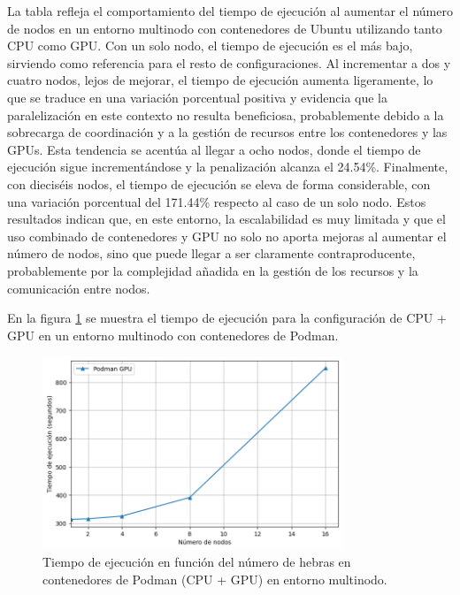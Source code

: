 La tabla refleja el comportamiento del tiempo de ejecución al aumentar el número de nodos en un entorno multinodo con contenedores de Ubuntu utilizando tanto CPU como GPU. Con un solo nodo, el tiempo de ejecución es el más bajo, sirviendo como referencia para el resto de configuraciones. Al incrementar a dos y cuatro nodos, lejos de mejorar, el tiempo de ejecución aumenta ligeramente, lo que se traduce en una variación porcentual positiva y evidencia que la paralelización en este contexto no resulta beneficiosa, probablemente debido a la sobrecarga de coordinación y a la gestión de recursos entre los contenedores y las GPUs. Esta tendencia se acentúa al llegar a ocho nodos, donde el tiempo de ejecución sigue incrementándose y la penalización alcanza el 24.54\%. Finalmente, con dieciséis nodos, el tiempo de ejecución se eleva de forma considerable, con una variación porcentual del 171.44\% respecto al caso de un solo nodo. Estos resultados indican que, en este entorno, la escalabilidad es muy limitada y que el uso combinado de contenedores y GPU no solo no aporta mejoras al aumentar el número de nodos, sino que puede llegar a ser claramente contraproducente, probablemente por la complejidad añadida en la gestión de los recursos y la comunicación entre nodos.

En la figura \ref{fig:multi-node_ubuntu_podman_gpu_time} se muestra el tiempo de ejecución para la configuración de CPU + GPU en un entorno multinodo con contenedores de Podman.

\begin{figure}[H]
    \centering
    \includegraphics[width=0.8\textwidth]{imagenes/cap5/multi-node_ubuntu_podman_gpu_time.png}
    \caption{Tiempo de ejecución en función del número de hebras en contenedores de Podman (CPU + GPU) en entorno multinodo.}
    \label{fig:multi-node_ubuntu_podman_gpu_time}
\end{figure}

